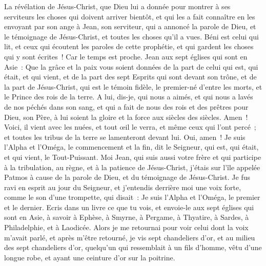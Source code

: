 \begin{multicols}{2}
\VerseOne{}La révélation de Jésus-Christ, que Dieu lui a donnée pour montrer à ses serviteurs les choses qui doivent arriver bientôt, et qui les a fait connaître en les envoyant par son ange à Jean, son serviteur,
qui a annoncé la parole de Dieu, et le témoignage de Jésus-Christ, et toutes les choses qu'il a vues.
Béni est celui qui lit, et ceux qui écoutent les paroles de cette prophétie, et qui gardent les choses qui y sont écrites~! Car le temps est proche.
Jean aux sept églises qui sont en Asie~: Que la grâce et la paix vous soient données de la part de celui qui est, qui était, et qui vient, et de la part des sept Esprits qui sont devant son trône,
et de la part de Jésus-Christ, qui est le témoin fidèle, le premier-né d'entre les morts, et le Prince des rois de la terre.
A lui, dis-je, qui nous a aimés, et qui nous a lavés de nos péchés dans son sang, et qui a fait de nous des rois et des prêtres pour Dieu, son Père, à lui soient la gloire et la force aux siècles des siècles. Amen~!
Voici, il vient avec les nuées, et tout œil le verra, et même ceux qui l'ont percé~; et toutes les tribus de la terre se lamenteront devant lui. Oui, amen~!
Je suis l'Alpha et l'Oméga, le commencement et la fin, dit le Seigneur, qui est, qui était, et qui vient, le Tout-Puissant.
Moi Jean, qui suis aussi votre frère et qui participe à la tribulation, au règne, et à la patience de Jésus-Christ, j'étais sur l'île appelée Patmos à cause de la parole de Dieu, et du témoignage de Jésus-Christ.
Je fus ravi en esprit au jour du Seigneur, et j'entendis derrière moi une voix forte, comme le son d'une trompette,
qui disait~: Je suis l'Alpha et l'Oméga, le premier et le dernier. Ecris dans un livre ce que tu vois, et envoie-le aux sept églises qui sont en Asie, à savoir à Ephèse, à Smyrne, à Pergame, à Thyatire, à Sardes, à Philadelphie, et à Laodicée.
Alors je me retournai pour voir celui dont la voix m'avait parlé, et après m'être retourné, je vis sept chandeliers d'or,
et au milieu des sept chandeliers d'or, quelqu'un qui ressemblait à un fils d'homme, vêtu d'une longue robe, et ayant une ceinture d'or sur la poitrine.

\end{multicols}
